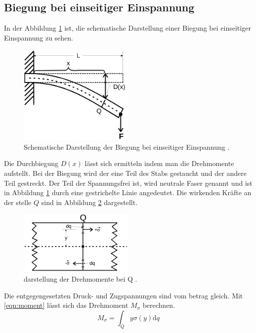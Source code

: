 \subsection{Biegung bei einseitiger Einspannung}
In der Abbildung \ref{fig:Einseitige_Einspannung} ist, die schematische Darstellung einer Biegung bei einseitiger
Einspannung zu sehen.
\begin{figure}
  \centering
  \includegraphics[width=0.5\textwidth]{einseitige.png}
  \caption{Schematische Darstellung der Biegung bei einseitiger Einspannung \cite{sample} .}
  \label{fig:Einseitige_Einspannung}
\end{figure}
Die Durchbiegung $D(x)$ lässt sich ermitteln indem man die Drehmomente aufstellt.
Bei der Biegung wird der eine Teil des Stabs gestaucht und der andere Teil gestreckt.
Der Teil der Spannungsfrei ist, wird neutrale Faser genannt und ist in Abbildung \ref{fig:Einseitige_Einspannung}
durch eine gestrichelte Linie angedeutet. Die wirkenden Kräfte an der stelle
$Q$ sind in Abbildung \ref{fig:Drehmomente} dargestellt.
\begin{figure}
  \centering
  \includegraphics[width=0.5\textwidth]{Drehmomente.png}
  \caption{darstellung der Drehmomente bei Q \cite{sample} .}
  \label{fig:Drehmomente}
\end{figure}
 Die entgegengesetzten Druck- und
Zugspannungen sind vom betrag gleich. Mit \eqref{eqn:moment} lässt sich das Drehmoment $M_\sigma$
berechnen.
\begin{equation}
  M_\sigma=\int_Q y\sigma(y)\text{d}q
  \label{eqn:moment}
\end{equation}
